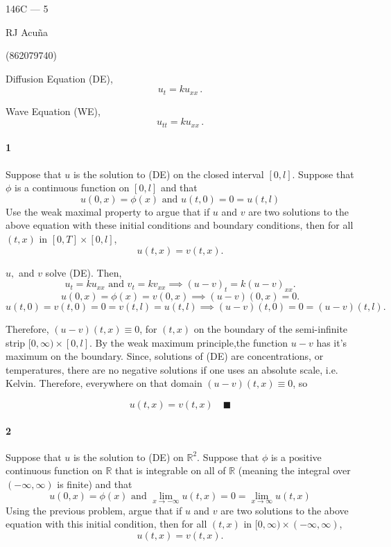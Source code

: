 \documentclass{article}
\newcommand\R{\mathbb{R}}
\begin{document}
\begin{center}
  146C --- 5

  RJ Acuña

  (862079740)
\end{center}\vspace{1.618em}

Diffusion Equation (DE),
\[u_t = ku_{xx}\, .\]

Wave Equation (WE),
\[u_{tt} = k u_{xx}\, .\]

\paragraph{1} Suppose that $u$ is the solution to (DE) on the closed interval $[0, l]$. Suppose that
$\phi$ is a continuous function on $[0, l]$ and that
\[u(0,x) = \phi(x)\text{ and } u(t,0)= 0 = u(t,l)\]
Use the weak maximal property to argue that if $u$ and $v$ are two solutions to the above equation
with these initial conditions and boundary conditions, then for all
$(t, x)$ in $[0, T] × [0, l]$,
\[u(t,x) = v(t,x).\]


$u, $ and $v$ solve (DE). Then,
\[u_t = ku_{xx}\text{ and }v_t = kv_{xx} \implies (u-v)_t =
  k(u-v)_{xx}.\]
\[u(0,x) = \phi(x) = v(0,x) \implies (u-v)(0,x) = 0.\]
\[u(t,0) = v(t,0) = 0 = v(t,l) = u(t,l) \implies (u-v)(t,0) = 0 = (u-v)(t,l).\]

Therefore, $(u-v)(t,x) \equiv 0$, for $(t,x)$ on the boundary of the
semi-infinite strip $[0,\infty)\times[0,l]$. By the weak maximum
principle,the function $u-v$ has
it's maximum on the boundary. Since, solutions of (DE) are
concentrations, or temperatures, there are no negative solutions if
one uses an absolute scale, i.e. Kelvin. Therefore, everywhere on that
domain $(u-v)(t,x) \equiv 0$, so

\[u(t,x) = v(t,x)\quad \blacksquare\]

\paragraph{2} Suppose that $u$ is the solution to (DE) on $\R^2$. Suppose that $\phi$ is a positive
continuous function on $\R$ that is integrable on all of $\R$ (meaning the integral over $(−∞,∞)$ is
finite) and that
\[u(0, x) = \phi(x)\text{ and } \lim_{x\rightarrow -\infty} u(t, x) =
  0 = \lim_{x\rightarrow \infty} u(t, x)\]
Using the previous problem, argue that if $u$ and $v$ are two solutions to the above equation with
this initial condition, then for all $(t, x)$ in $[0, ∞) × (−∞,∞)$,
\[u(t, x) = v(t, x).\]
\end{document}
